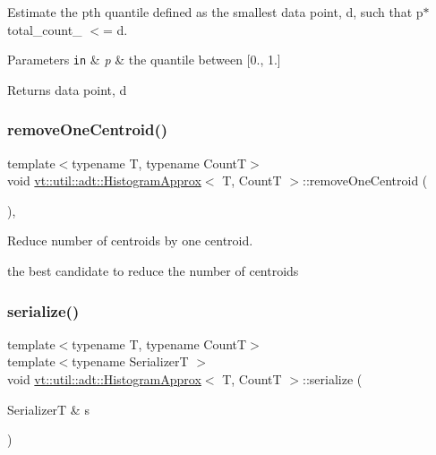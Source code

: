 Estimate the p\textquotesingle{}th quantile defined as the smallest data point, d, such that p$\ast$total\+\_\+count\+\_\+ $<$= d. 


\begin{DoxyParams}[1]{Parameters}
\mbox{\tt in}  & {\em p} & the quantile between \mbox{[}0., 1.\mbox{]}\\
\hline
\end{DoxyParams}
\begin{DoxyReturn}{Returns}
data point, d 
\end{DoxyReturn}
\mbox{\label{structvt_1_1util_1_1adt_1_1_histogram_approx_a948e8a7dec4f205fc5bf1d1b896211b1}} 
\subsubsection{\texorpdfstring{remove\+One\+Centroid()}{removeOneCentroid()}}
{\footnotesize\ttfamily template$<$typename T, typename CountT$>$ \\
void \hyperlink{structvt_1_1util_1_1adt_1_1_histogram_approx}{vt\+::util\+::adt\+::\+Histogram\+Approx}$<$ T, CountT $>$\+::remove\+One\+Centroid (\begin{DoxyParamCaption}{ }\end{DoxyParamCaption})\hspace{0.3cm}{\ttfamily [inline]}, {\ttfamily [private]}}



Reduce number of centroids by one centroid. 

the best candidate to reduce the number of centroids \mbox{\label{structvt_1_1util_1_1adt_1_1_histogram_approx_aae8a321f42f550b711aeeb50ac8ef913}} 
\subsubsection{\texorpdfstring{serialize()}{serialize()}}
{\footnotesize\ttfamily template$<$typename T, typename CountT$>$ \\
template$<$typename SerializerT $>$ \\
void \hyperlink{structvt_1_1util_1_1adt_1_1_histogram_approx}{vt\+::util\+::adt\+::\+Histogram\+Approx}$<$ T, CountT $>$\+::serialize (\begin{DoxyParamCaption}\item[{SerializerT \&}]{s }\end{DoxyParamCaption})\hspace{0.3cm}{\ttfamily [inline]}}



